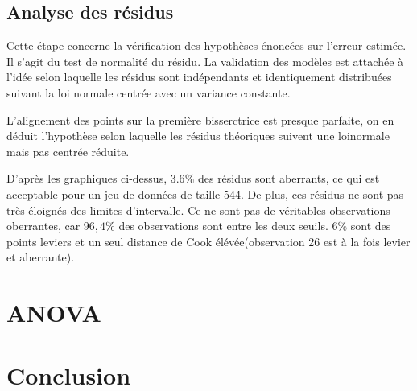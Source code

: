 \documentclass[12pt, twocolumn]{article}
\begin{document}
\subsection{Analyse des résidus}
Cette étape concerne la vérification des hypothèses énoncées sur l'erreur estimée. Il s'agit du test de normalité du résidu. La validation des modèles est attachée à
l'idée selon laquelle les résidus sont indépendants et identiquement distribuées suivant la loi normale centrée avec un variance constante.


L'alignement des points sur la première bisserctrice est presque parfaite, on en déduit l'hypothèse selon laquelle les résidus théoriques suivent une loinormale mais pas centrée réduite.


D'après les graphiques ci-dessus, $3.6\%$ des résidus sont aberrants, ce qui est acceptable pour un jeu de données de taille $544$.
De plus, ces résidus ne sont pas très éloignés des limites d'intervalle. Ce ne sont pas de véritables observations oberrantes, car $96,4\%$ des
observations sont entre les deux seuils. $6\%$ sont des points leviers et un seul distance de Cook élévée(observation 26 est à la fois levier et aberrante).



\section{ANOVA} 


\section{Conclusion} 


  


%
\end{document}
